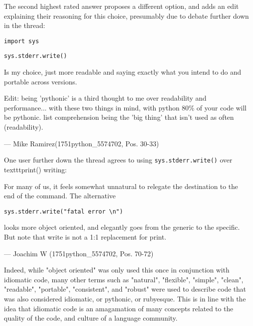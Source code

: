 The second highest rated answer proposes a different option, and adds an edit explaining their reasoning for this choice,
presumably due to debate further down in the thread:

\begin{displayquote}
    \texttt{import sys}

    \texttt{sys.stderr.write()}

    Is my choice, just more readable and saying exactly what you intend to do and portable across versions.

    Edit: being 'pythonic' is a third thought to me over readability and performance... with these two things in mind,
    with python 80\% of your code will be pythonic. list comprehension being the 'big thing' that isn't used as often (readability).

    --- Mike Ramirez(1751python\_5574702, Pos. 30-33)

\end{displayquote}

One user further down the thread agrees to using \texttt{sys.stderr.write()} over texttt{print()} writing:

\begin{displayquote}
    For many of us, it feels somewhat unnatural to relegate the destination to the end of the command. The alternative

    \texttt{sys.stderr.write("fatal error \textbackslash n")}

    looks more object oriented, and elegantly goes from the generic to the specific. But note that write is not a 1:1
    replacement for print.

    --- Joachim W (1751python\_5574702, Pos. 70-72)

\end{displayquote}

Indeed, while "object oriented" was only used this once in conjunction with idiomatic code, many other terms such as
"natural", "flexible", "simple", "clean", "readable", "portable", "consistent", and "robust" were used to describe
code that was also considered idiomatic, or pythonic, or rubyesque. This is in line with the idea that idiomatic code
is an amagamation of many concepts related to the quality of the code, and culture of a language community.
